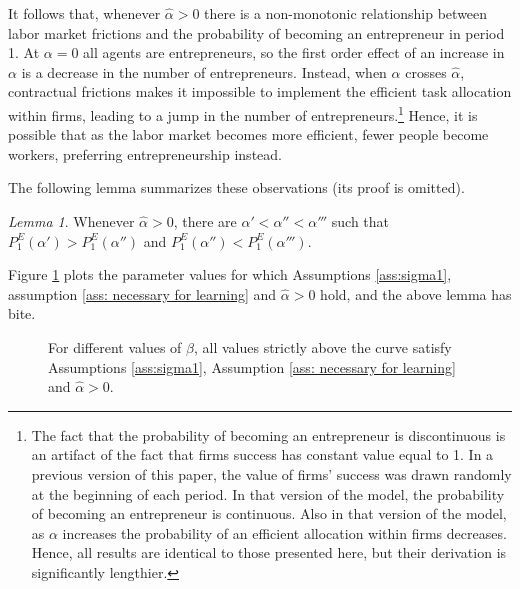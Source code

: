 \documentclass[12pt,american]{paper}
\theoremstyle{remark}
\newtheorem{lemma}{Lemma}
\begin{document}
It follows that, whenever $\hat \alpha > 0$ there is a non-monotonic relationship between labor market frictions and the probability of becoming an entrepreneur in period 1. %
At $\alpha=0$ all agents are entrepreneurs, so the first order effect of an increase in $\alpha$ is a decrease in the number of entrepreneurs.  Instead, when $\alpha$ crosses $\hat \alpha$, contractual frictions makes it impossible to implement the efficient task allocation within firms, leading to a jump in the number of entrepreneurs.\footnote{The fact that the probability of becoming an entrepreneur is discontinuous is an artifact of the fact that firms success has constant value equal to 1. In a previous version of this paper, the value of firms' success was drawn randomly at the beginning of each period. In that version of the model, the probability of becoming an entrepreneur is continuous. Also in that version of the model, as $\alpha$ increases the probability of an efficient allocation within firms decreases. Hence, all results are identical to those presented here, but their derivation is significantly lengthier. }  Hence, it is possible that as the labor market becomes more efficient, fewer people become workers, preferring entrepreneurship instead.  

The following lemma summarizes these observations (its proof is omitted).
\begin{lemma}\label{lem: p1}
Whenever $\hat \alpha > 0$, there are $\alpha'<\alpha''<\alpha'''$ such that $P^E_1(\alpha')>P^E_1(\alpha'')$ and $P^E_1(\alpha'')<P^E_1(\alpha''')$.
\end{lemma}
\noindent Figure \ref{fig:parameter restriction} plots the parameter values for which Assumptions \ref{ass:sigma1}, assumption \ref{ass: necessary for learning}  and $\hat \alpha > 0$ hold, and the above lemma has bite. 



\begin{figure}
\centering 
{}
\caption{For different values of $\beta$, all values strictly above the curve satisfy Assumptions \ref{ass:sigma1}, Assumption \ref{ass: necessary for learning}  and $\hat \alpha > 0$. \label{fig:parameter restriction}}
\end{figure}
\end{document}
